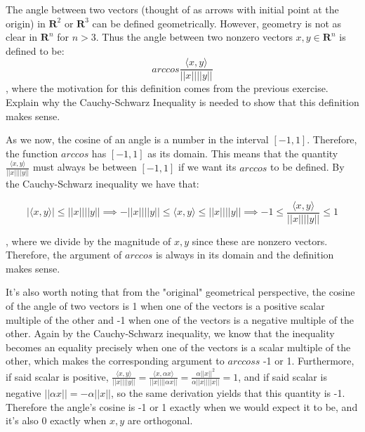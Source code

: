 \begin{exercise}{14}
The angle between two vectors (thought of as arrows with initial point at the origin) in $\mathbf{R}^2$ or $\mathbf{R}^3$ can be defined geometrically. However, geometry is not as clear in $\mathbf{R}^n$ for $n > 3$. Thus the angle between two nonzero vectors $x, y \in \mathbf{R}^n$ is defined to be:
$$arccos \frac{\langle x, y \rangle}{\lvert \lvert x \rvert \rvert \lvert \lvert y \rvert \rvert}$$
, where the motivation for this definition comes from the previous exercise. Explain why the Cauchy-Schwarz Inequality is needed to show that this definition makes sense.
\end{exercise}
\begin{solution}

As we now, the cosine of an angle is a number in the interval $[-1, 1]$. Therefore, the function $arccos$ has $[-1, 1]$ as its domain. This means that the quantity $\frac{\langle x, y \rangle}{\lvert \lvert x \rvert \rvert \lvert \lvert y \rvert \rvert}$ must always be between $[-1, 1]$ if we want its $arccos$ to be defined. By the Cauchy-Schwarz inequality we have that:

$$\lvert \langle x, y \rangle \rvert \leq \lvert \lvert x \rvert \rvert \lvert \lvert y \rvert \rvert \implies -\lvert \lvert x \rvert \rvert \lvert \lvert y \rvert \rvert \leq \langle x, y \rangle \leq \lvert \lvert x \rvert \rvert \lvert \lvert y \rvert \rvert \implies -1 \leq \frac{\langle x, y \rangle}{\lvert \lvert x \rvert \rvert \lvert \lvert y \rvert \rvert} \leq 1$$

, where we divide by the magnitude of $x, y$ since these are nonzero vectors. Therefore, the argument of $arccos$ is always in its domain and the definition makes sense. 

It's also worth noting that from the "original" geometrical perspective, the cosine of the angle of two vectors is 1 when one of the vectors is a positive scalar multiple of the other and -1 when one of the vectors is a negative multiple of the other. Again by the Cauchy-Schwarz inequality, we know that the inequality becomes an equality precisely when one of the vectors is a scalar multiple of the other, which makes the corresponding argument to $arccoss$ -1 or 1. Furthermore, if said scalar is positive, $\frac{\langle x, y \rangle}{\lvert \lvert x \rvert \rvert \lvert \lvert y \rvert \rvert} = \frac{\langle x, \alpha x \rangle}{\lvert \lvert x \rvert \rvert \lvert \lvert \alpha x \rvert \rvert} = \frac{\alpha \lvert \lvert x \rvert \rvert ^2}{\alpha \lvert \lvert x \rvert \rvert \lvert \lvert x \rvert \rvert} = 1$, and if said scalar is negative $\lvert \lvert \alpha x \rvert \rvert = -\alpha \lvert \lvert x \rvert \rvert$, so the same derivation yields that this quantity is -1. Therefore the angle's cosine is -1 or 1 exactly when we would expect it to be, and it's also 0 exactly when $x, y$ are orthogonal.
\end{solution}


